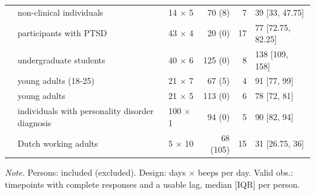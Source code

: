 \begin{landscape}
\begin{xltabular}{\linewidth}{@{}>{\raggedright\arraybackslash}p{7.5cm} >{\raggedright\arraybackslash}X l r r l@{}}
\textcite{pavani2017} & non-clinical individuals & 14 $\times$ 5 & 70 (8) & 7 & 39 [33, 47.75] \\
\textcite{reeves2020} & participants with PTSD & 43 $\times$ 4 & 20 (0) & 17 & 77 [72.75, 82.25] \\
\textcite{rowland2020} & undergraduate students & 40 $\times$ 6 & 125 (0) & 8 & 138 [109, 158] \\
\textcite{wang2024} & young adults (18-25) & 21 $\times$ 7 & 67 (5) & 4 & 91 [77, 99] \\
\textcite{westhoff2024} & young adults & 21 $\times$ 5 & 113 (0) & 6 & 78 [72, 81] \\
\textcite{wright2019,wright2015} & individuals with personality disorder diagnosis & 100 $\times$ 1 & 94 (0) & 5 & 90 [82, 94] \\
\textcite{vanwoerkom2022} & Dutch working adults & 5 $\times$ 10 & 68 (105) & 15 & 31 [26.75, 36] \\
\end{xltabular}

\noindent \textit{Note.} Persons: included (excluded). Design: days $\times$ beeps per day. Valid obs.: timepoints with complete responses and a usable lag, median [IQR] per person. 
\end{landscape}
